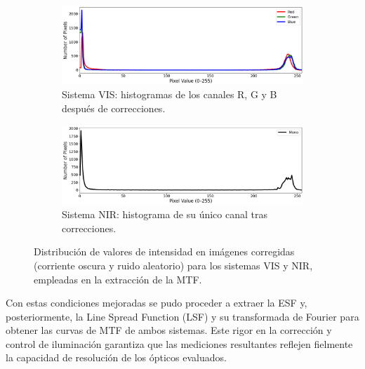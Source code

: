       \begin{figure}[h]
          \centering
          \begin{subfigure}[b]{\linewidth}
              \centering
              \includegraphics[width=\linewidth]{Figures/C4/hist_vis_MTF.png}
              \caption{Sistema VIS: histogramas de los canales R, G y B después de correcciones.}
              \label{fig:histogram_vis}
          \end{subfigure}
          \hfill
          \begin{subfigure}[b]{\linewidth}
              \centering
              \includegraphics[width=\linewidth]{Figures/C4/hist_nir_MTF.png}
              \caption{Sistema NIR: histograma de su único canal tras correcciones.}
              \label{fig:histogram_nir}
          \end{subfigure}
          \caption{Distribución de valores de intensidad en imágenes corregidas (corriente oscura y ruido aleatorio) para los sistemas VIS y NIR, empleadas en la extracción de la MTF.}
          \label{fig:histogram_vis_nir}
      \end{figure}
      
      Con estas condiciones mejoradas se pudo proceder a extraer la ESF y, posteriormente, la Line Spread Function (LSF) y su transformada de Fourier para obtener las curvas de MTF de ambos sistemas. Este rigor en la corrección y control de iluminación garantiza que las mediciones resultantes reflejen fielmente la capacidad de resolución de los ópticos evaluados.      %
      
